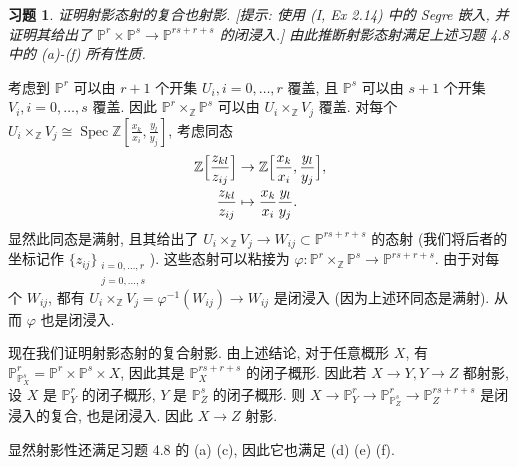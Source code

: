 \documentclass{article}
\theoremstyle{exercise}
\newtheorem{exercise}{习题}[section]
\theoremstyle{plain}
\theoremstyle{remark}
\newenvironment{proofc}{\proof}{\endproof}
\def\P{\mathbb{P}}
\def\Z{\mathbb{Z}}
\def\Spec{\operatorname{Spec}}
\begin{document}
\begin{exercise}
  证明射影态射的复合也射影.
  [\emph{提示: 使用 (I, Ex 2.14) 中的 Segre 嵌入,
    并证明其给出了 $\P^r \times \P^s \to \P^{rs + r + s}$ 的闭浸入.}]
  由此推断射影态射满足上述习题 4.8 中的 (a)-(f) 所有性质.
\end{exercise}

\begin{proofc}
  考虑到 $\P^r$ 可以由 $r + 1$ 个开集 $U_i, i = 0, \dots, r$ 覆盖,
  且 $\P^s$ 可以由 $s + 1$ 个开集 $V_i, i = 0, \dots, s$ 覆盖.
  因此 $\P^r \times_{\Z} \P^s$ 可以由 $U_i \times_{\Z} V_j$ 覆盖.
  对每个 $U_i \times_{\Z} V_j \cong \Spec \Z[\frac{x_{k}}{x_i}, \frac{y_{l}}{y_j}]$,
  考虑同态
  \begin{align*}
    \Z\Bigl[\frac{z_{kl}}{z_{ij}}\Bigr] & \to \Z\Bigl[\frac{x_k}{x_i}, \frac{y_l}{y_j}\Bigr], \\
    \frac{z_{kl}}{z_{ij}} & \mapsto \frac{x_k}{x_i} \frac{y_l}{y_j}.
  \end{align*}
  显然此同态是满射, 且其给出了 $U_i \times_{\Z} V_j \to W_{ij} \subset \P^{rs + r + s}$ 的态射
  (我们将后者的坐标记作 $\{z_{ij}\}_{\substack{i = 0, \dots, r \\ j = 0, \dots, s}}$).
  这些态射可以粘接为 $\varphi \colon \P^r \times_{\Z} \P^s \to \P^{rs + r + s}$.
  由于对每个 $W_{ij}$, 都有 $U_i \times_{\Z} V_j = \varphi^{-1}(W_{ij}) \to W_{ij}$ 是闭浸入
  (因为上述环同态是满射). 从而 $\varphi$ 也是闭浸入.

  现在我们证明射影态射的复合射影.
  由上述结论, 对于任意概形 $X$, 有 $\P_{\P_X^s}^r = \P^r \times \P^s \times X$,
  因此其是 $\P^{rs + r + s}_X$ 的闭子概形.
  因此若 $X \to Y, Y \to Z$ 都射影, 设 $X$ 是 $\P_Y^r$ 的闭子概形, $Y$ 是 $\P_Z^s$ 的闭子概形.
  则 $X \to \P_Y^r \to \P_{\P_Z^s}^r \to \P^{rs + r + s}_Z$ 是闭浸入的复合, 也是闭浸入.
  因此 $X \to Z$ 射影.

  显然射影性还满足习题 4.8 的 (a) (c), 因此它也满足 (d) (e) (f).
\end{proofc}
\end{document}
